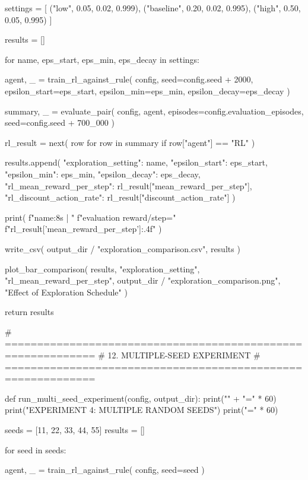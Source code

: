     settings = [
        ("low", 0.05, 0.02, 0.999),
        ("baseline", 0.20, 0.02, 0.995),
        ("high", 0.50, 0.05, 0.995)
    ]

    results = []

    for name, eps_start, eps_min, eps_decay in settings:

        agent, _ = train_rl_against_rule(
            config,
            seed=config.seed + 2000,
            epsilon_start=eps_start,
            epsilon_min=eps_min,
            epsilon_decay=eps_decay
        )

        summary, _ = evaluate_pair(
            config,
            agent,
            episodes=config.evaluation_episodes,
            seed=config.seed + 700_000
        )

        rl_result = next(
            row for row in summary
            if row["agent"] == "RL"
        )

        results.append({
            "exploration_setting": name,
            "epsilon_start": eps_start,
            "epsilon_min": eps_min,
            "epsilon_decay": eps_decay,
            "rl_mean_reward_per_step":
                rl_result["mean_reward_per_step"],
            "rl_discount_action_rate":
                rl_result["discount_action_rate"]
        })

        print(
            f"{name:8s} | "
            f"evaluation reward/step="
            f"{rl_result['mean_reward_per_step']:.4f}"
        )

    write_csv(
        output_dir / "exploration_comparison.csv",
        results
    )

    plot_bar_comparison(
        results,
        "exploration_setting",
        "rl_mean_reward_per_step",
        output_dir / "exploration_comparison.png",
        "Effect of Exploration Schedule"
    )

    return results


# ============================================================
# 12. MULTIPLE-SEED EXPERIMENT
# ============================================================

def run_multi_seed_experiment(config, output_dir):
    print("\n" + "=" * 60)
    print("EXPERIMENT 4: MULTIPLE RANDOM SEEDS")
    print("=" * 60)

    seeds = [11, 22, 33, 44, 55]
    results = []

    for seed in seeds:

        agent, _ = train_rl_against_rule(
            config, seed=seed
        )


